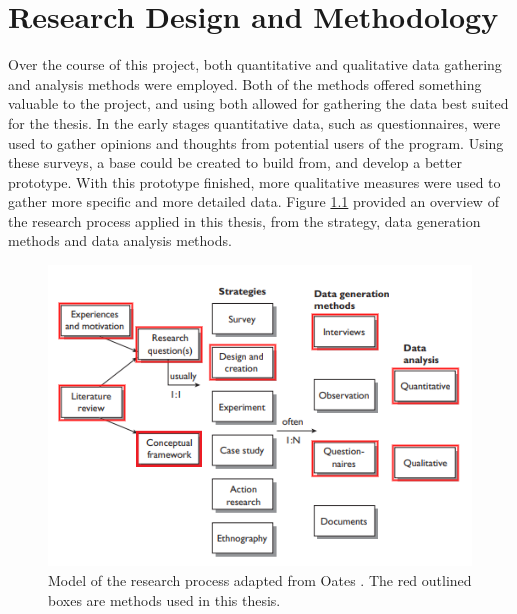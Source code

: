 
\chapter{Research Design and Methodology}
Over the course of this project, both quantitative and qualitative data gathering and analysis methods were employed. Both of the methods offered something valuable to the project, and using both allowed for gathering the data best suited for the thesis. In the early stages quantitative data, such as questionnaires, were used to gather opinions and thoughts from potential users of the program. Using these surveys, a base could be created to build from, and develop a better prototype. With this prototype finished, more qualitative measures were used to gather more specific and more detailed data. Figure \ref{fig:researchMethod} provided an overview of the research process applied in this thesis, from the strategy, data generation methods and data analysis methods.  

\begin{figure}[!ht]
     \centering
     \includegraphics[width=.8\textwidth]{./fig/researchMethodology/OatesResearch.png}
     \captionsetup{width=0.8\linewidth}
     \caption{Model of the research process adapted from Oates \cite{oates2005researching}. The red outlined boxes are methods used in this thesis.}
     \label{fig:researchMethod}
 \end{figure}

